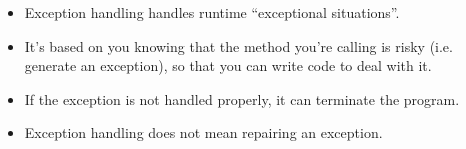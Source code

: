 \setlength{\columnsep}{3pt}
\begin{flushleft}

	\begin{itemize}
		\item Exception handling handles runtime “exceptional situations”.
		\item  It’s based on you knowing that the method you’re calling is risky (i.e. generate an exception), so that you can write code to deal with it. 
		\item If the exception is not handled properly, it can terminate the program.
		\item Exception handling does not mean repairing an exception.
	\end{itemize}
	
\end{flushleft}
\newpage


